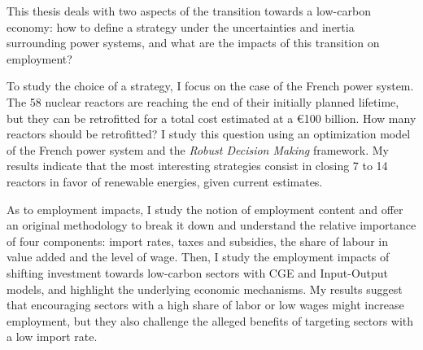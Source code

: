 
This thesis deals with two aspects of the transition towards a low-carbon economy: how to define a strategy under the uncertainties and inertia surrounding power systems, and what are the impacts of this transition on employment?

To study the choice of a strategy, I focus on the case of the French power system. The 58 nuclear reactors are reaching the end of their initially planned lifetime, but they can be retrofitted for a total cost estimated at a \euro 100 billion. How many reactors should be retrofitted? I study this question using an optimization model of the French power system and the \textit{Robust Decision Making} framework. My results indicate that the most interesting strategies consist in closing 7 to 14 reactors in favor of renewable energies, given current estimates.

As to employment impacts, I study the notion of employment content and offer an original methodology to break it down and understand the relative importance of four components: import rates, taxes and subsidies, the share of labour in value added and the level of wage.
Then, I study the employment impacts of shifting investment towards low-carbon sectors with CGE and Input-Output models, and highlight the underlying economic mechanisms.
My results suggest that encouraging sectors with a high share of labor or low wages might increase employment, but they also challenge the alleged benefits of targeting sectors with a low import rate.